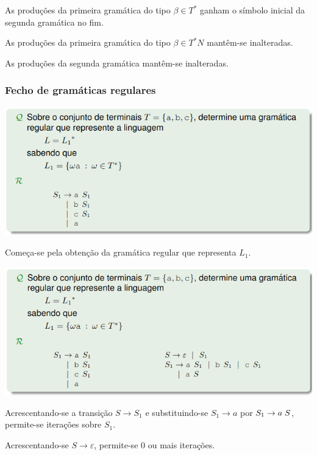 \documentclass{article}
\begin{document}
\begin{flushleft}
  \item As produções da primeira gramática do tipo $\beta \in T^*$ ganham o símbolo
  inicial da segunda gramática no fim.
  \item As produções da primeira gramática do tipo $\beta \in T^* N$ mantêm-se inalteradas.
  \item As produções da segunda gramática mantêm-se inalteradas.

\end{flushleft}

\subsubsection{Fecho de gramáticas regulares}

\begin{flushleft}
  \begin{center}
    \includegraphics[scale=0.4]{11}
  \end{center}

  Começa-se pela obtenção da gramática regular que representa $L_1$.

  \begin{center}
    \includegraphics[scale=0.4]{12}
  \end{center}

  \item Acrescentando-se a transição $S \rightarrow S_1$ e substituindo-se $S_1 \rightarrow a$
  por $S_1 \rightarrow a \hspace{1mm} S$, permite-se iterações sobre $S_1$.
  \item Acrescentando-se $S \rightarrow \varepsilon$, permite-se 0 ou mais iterações.


\end{flushleft}
\end{document}
